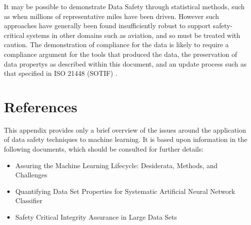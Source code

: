 It may be possible to demonstrate Data Safety through statistical methods,
such as when millions of representative miles have been driven.
However such approaches have generally been found insufficiently robust to support safety-critical systems in other domains
such as aviation, and so must be treated with caution.
The demonstration of compliance for the data is likely to require a compliance argument for the tools that produced the data,
the preservation of \glspl{data property} as described within this document, and an update process such as that specified in ISO 21448 (SOTIF)
\cite{citation:ISO21448}.

\section{References}
This appendix provides only a brief overview of the issues around the application of data safety techniques to machine learning. It is based upon \gls{information} in the following documents, which should be consulted for further details:
\begin{itemize}
\item Assuring the Machine Learning Lifecycle: Desiderata, Methods, and Challenges \cite{citation:Ashmore2019}
\item Quantifying Data Set Properties for Systematic Artificial Neural Network Classifier  \cite{citation:Hond2020}
\item Safety Critical Integrity Assurance in Large Data Sets \cite{citation:Sutherland2020}
\end{itemize}
